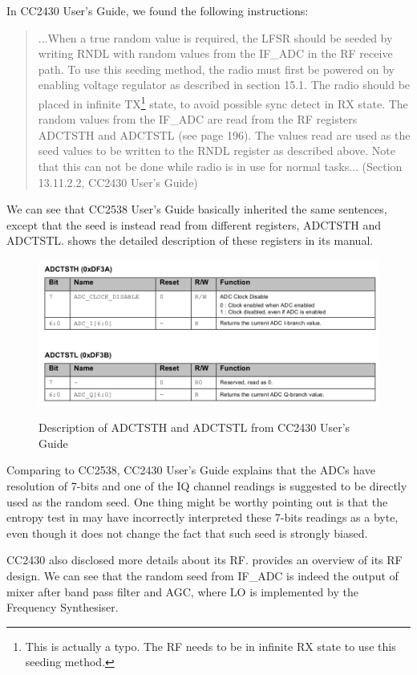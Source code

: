 In CC2430 User's Guide, we found the following instructions:
\begin{quote}
...When a true random value is required, the LFSR should be seeded by writing RNDL with random values from the IF\_ADC in the RF receive path. To use this seeding method, the radio must first be powered on by enabling voltage regulator as described in section 15.1. The radio should be placed in infinite TX\footnote{This is actually a typo. The RF needs to be in infinite RX state to use this seeding method.} state, to avoid possible sync detect in RX state. The random values from the IF\_ADC are read from the RF registers ADCTSTH and ADCTSTL (see page 196). The values read are used as the seed values to be written to the RNDL register as described above. Note that this can not be done while radio is in use for normal tasks... (Section 13.11.2.2, CC2430 User's Guide)
\end{quote}

We can see that CC2538 User's Guide basically inherited the same sentences, except that the seed is instead read from different registers, ADCTSTH and ADCTSTL.  shows the detailed description of these registers in its manual.

\begin{figure}
\center
\caption{Description of ADCTSTH and ADCTSTL from CC2430 User's Guide}
\includegraphics[width=\linewidth]{./figures/CC2430_ADCTST.png}
\label{CC2430_ADCTST}
\end{figure}

Comparing to CC2538, CC2430 User's Guide explains that the ADCs have resolution of 7-bits and one of the IQ channel readings is suggested to be directly used as the random seed. One thing might be worthy pointing out is that the entropy test in \cite{CC2430Fail} may have incorrectly interpreted these 7-bits readings as a byte, even though it does not change the fact that such seed is strongly biased.

CC2430 also disclosed more details about its RF.  provides an overview of its RF design.  We can see that the random seed from IF\_ADC is indeed the output of mixer after band pass filter and AGC, where LO is implemented by the Frequency Synthesiser.

